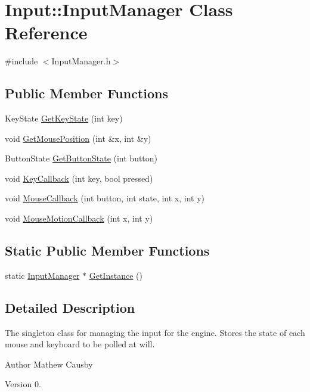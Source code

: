 \hypertarget{class_input_1_1_input_manager}{}\section{Input\+:\+:Input\+Manager Class Reference}
\label{class_input_1_1_input_manager}


{\ttfamily \#include $<$Input\+Manager.\+h$>$}

\subsection*{Public Member Functions}
\begin{DoxyCompactItemize}
\item 
Key\+State \hyperlink{class_input_1_1_input_manager_a6ac7c060e63c0f30563c29b9d2b41476}{Get\+Key\+State} (int key)
\item 
void \hyperlink{class_input_1_1_input_manager_abb16770c5d1d69326dbe931782a5c0e5}{Get\+Mouse\+Position} (int \&x, int \&y)
\item 
Button\+State \hyperlink{class_input_1_1_input_manager_a42a6d92229690b8dc363dbf3012d20e1}{Get\+Button\+State} (int button)
\item 
void \hyperlink{class_input_1_1_input_manager_a81353902fe615c99f742cd280335e72f}{Key\+Callback} (int key, bool pressed)
\item 
void \hyperlink{class_input_1_1_input_manager_a9ec4f960256ab6a8b50297b9e3bf0307}{Mouse\+Callback} (int button, int state, int x, int y)
\item 
void \hyperlink{class_input_1_1_input_manager_ab241c84c47dd69505ea51e93a33f2113}{Mouse\+Motion\+Callback} (int x, int y)
\end{DoxyCompactItemize}
\subsection*{Static Public Member Functions}
\begin{DoxyCompactItemize}
\item 
static \hyperlink{class_input_1_1_input_manager}{Input\+Manager} $\ast$ \hyperlink{class_input_1_1_input_manager_ac4df9b50e7cfc4e59f061a08ed7f4925}{Get\+Instance} ()
\end{DoxyCompactItemize}


\subsection{Detailed Description}
The singleton class for managing the input for the engine. Stores the state of each mouse and keyboard to be polled at will. \begin{DoxyAuthor}{Author}
Mathew Causby 
\end{DoxyAuthor}
\begin{DoxyVersion}{Version}
0. 
\end{DoxyVersion}


